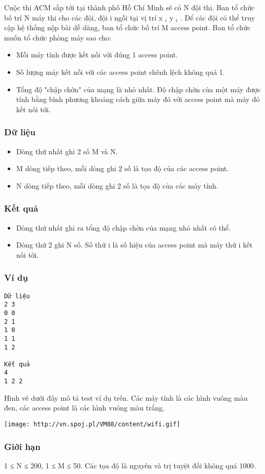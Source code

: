 

Cuộc thi ACM sắp tới tại thành phố Hồ Chí Minh sẽ có N đội thi. Ban tổ chức bố trí N máy thi cho các đội, đội i ngồi tại vị trí x $_ i $ y $_ i $ . Để các đội có thể truy cập hệ thống nộp bài dễ dàng, ban tổ chức bố trí M access point. Ban tổ chức muốn tổ chức phòng máy sao cho:
\begin{itemize}
	\item Mỗi máy tính được kết nối với đúng 1 access point.
	\item Số lượng máy kết nối với các access point chênh lệch không quá 1.
	\item Tổng độ "chập chờn" của mạng là nhỏ nhất. Độ chập chờn của một máy được tính bằng bình phương khoảng cách giữa máy đó với access point mà máy đó kết nối tới.
\end{itemize}

\subsubsection{Dữ liệu}
\begin{itemize}
	\item Dòng thứ nhất ghi 2 số M và N.
	\item M dòng tiếp theo, mỗi dòng ghi 2 số là tọa độ của các access point.
	\item N dòng tiếp theo, mỗi dòng ghi 2 số là tọa độ của các máy tính.
\end{itemize}

\subsubsection{Kết quả}
\begin{itemize}
	\item Dòng thứ nhất ghi ra tổng độ chập chờn của mạng nhỏ nhất có thể.
	\item Dòng thứ 2 ghi N số. Số thứ i là số hiệu của access point mà máy thứ i kết nối tới.
\end{itemize}

\subsubsection{Ví dụ}
\begin{verbatim}
Dữ liệu
2 3
0 0
2 1
1 0
1 1
1 2

Kết quả
4
1 2 2
\end{verbatim}

Hình vẽ dưới đây mô tả test ví dụ trên. Các máy tính là các hình vuông màu đen, các access point là các hình vuông màu trắng.


\texttt{[image: http://vn.spoj.pl/VM08/content/wifi.gif]}

\subsubsection{Giới hạn}

1 ≤ N ≤ 200, 1 ≤ M ≤ 50. Các tọa độ là nguyên và trị tuyệt đối không quá 1000.